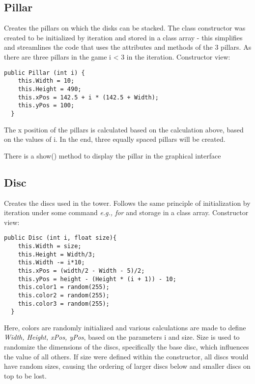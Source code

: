 \documentclass[
	12pt,				%
	oneside,			%
	a4paper,			%
	english,			%
	brazil,				%
	]{abntex2}
\begin{document}
{ \subsection{Pillar}
 Creates the pillars on which the disks can be stacked. The class constructor was created to be initialized by iteration and stored in a class array - this simplifies and streamlines the code that uses the attributes and methods of the 3 pillars. As there are three pillars in the game i < 3 in the iteration. Constructor view:

\begin{itshape}
\begin{verbatim}
public Pillar (int i) {
    this.Width = 10;
    this.Height = 490;
    this.xPos = 142.5 + i * (142.5 + Width);
    this.yPos = 100;
  }
\end{verbatim}
\end{itshape}

The x position of the pillars is calculated based on the calculation above, based on the values of i. In the end, three equally spaced pillars will be created.

There is a show() method to display the pillar in the graphical interface

\subsection{Disc}
Creates the discs used in the tower. Follows the same principle of initialization by iteration under some command \textit{e.g., for} and storage in a class array. Constructor view:

\begin{itshape}
\begin{verbatim}
public Disc (int i, float size){
    this.Width = size;
    this.Height = Width/3;
    this.Width -= i*10;
    this.xPos = (width/2 - Width - 5)/2;
    this.yPos = height - (Height * (i + 1)) - 10;
    this.color1 = random(255);
    this.color2 = random(255);
    this.color3 = random(255);
  }
\end{verbatim}
\end{itshape}
Here, colors are randomly initialized and various calculations are made to define \textit{Width, Height, xPos, yPos}, based on the parameters i and size. Size is used to randomize the dimensions of the discs, specifically the base disc, which influences the value of all others. If size were defined within the constructor, all discs would have random sizes, causing the ordering of larger discs below and smaller discs on top to be lost.

}
\end{document}
